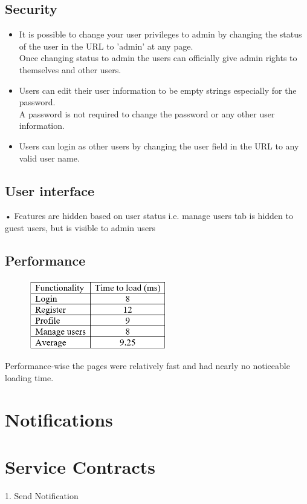 \documentclass[english]{article}
\begin{document}
\subsection{Security}
\begin{itemize}
     \item It is possible to change your user privileges to admin by changing the status of the user in the URL to 'admin' at any page.\\
     Once changing status to admin the users can officially give admin rights to themselves and other users.
     \item Users can edit their user information to be empty strings especially for the password.\\
     A password is not required to change the password or any other user information.
     \item Users can login as other users by changing the user field in the URL to any valid user name.
   \end{itemize}
\subsection{User interface}
•	Features are hidden based on user status i.e. manage users tab is hidden to guest users, but is visible to admin users\\
\subsection{Performance}
\begin{figure}[H]
\includegraphics[width=60mm]{15.png}
\end{figure}
Performance-wise the pages were relatively fast and had nearly no noticeable loading time.
\section{Notifications}
\section{Service Contracts}
1.	Send Notification\\
\end{document}
